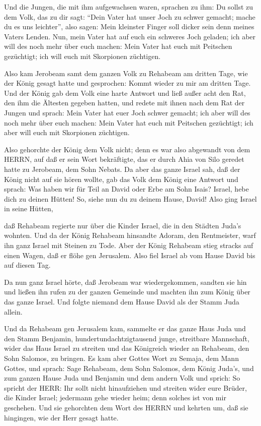  Und die Jungen, die mit ihm aufgewachsen waren, sprachen
zu ihm: Du sollst zu dem Volk, das zu dir sagt: ``Dein Vater hat unser
Joch zu schwer gemacht; mache du es uns leichter'', also sagen: Mein
kleinster Finger soll dicker sein denn meines Vaters Lenden.
 Nun, mein Vater hat auf euch ein schweres Joch geladen;
ich aber will des noch mehr über euch machen: Mein Vater hat euch mit
Peitschen gezüchtigt; ich will euch mit Skorpionen züchtigen.

 Also kam Jerobeam samt dem ganzen Volk zu Rehabeam am
dritten Tage, wie der König gesagt hatte und gesprochen: Kommt wieder zu
mir am dritten Tage.  Und der König gab dem Volk eine harte
Antwort und ließ außer acht den Rat, den ihm die Ältesten gegeben
hatten,  und redete mit ihnen nach dem Rat der Jungen und
sprach: Mein Vater hat euer Joch schwer gemacht; ich aber will des noch
mehr über euch machen: Mein Vater hat euch mit Peitschen gezüchtigt; ich
aber will euch mit Skorpionen züchtigen.

 Also gehorchte der König dem Volk nicht; denn es war also
abgewandt von dem HERRN, auf daß er sein Wort bekräftigte, das er durch
Ahia von Silo geredet hatte zu Jerobeam, dem Sohn Nebats. 
Da aber das ganze Israel sah, daß der König nicht auf sie hören wollte,
gab das Volk dem König eine Antwort und sprach: Was haben wir für Teil
an David oder Erbe am Sohn Isais? Israel, hebe dich zu deinen Hütten!
So, siehe nun du zu deinem Hause, David! Also ging Israel in seine
Hütten,

 daß Rehabeam regierte nur über die Kinder Israel, die in
den Städten Juda's wohnten.  Und da der König Rehabeam
hinsandte Adoram, den Rentmeister, warf ihn ganz Israel mit Steinen zu
Tode. Aber der König Rehabeam stieg stracks auf einen Wagen, daß er
flöhe gen Jerusalem.  Also fiel Israel ab vom Hause David
bis auf diesen Tag.

 Da nun ganz Israel hörte, daß Jerobeam war wiedergekommen,
sandten sie hin und ließen ihn rufen zu der ganzen Gemeinde und machten
ihn zum König über das ganze Israel. Und folgte niemand dem Hause David
als der Stamm Juda allein.

 Und da Rehabeam gen Jerusalem kam, sammelte er das ganze
Haus Juda und den Stamm Benjamin, hundertundachtzigtausend junge,
streitbare Mannschaft, wider das Haus Israel zu streiten und das
Königreich wieder an Rehabeam, den Sohn Salomos, zu bringen.
 Es kam aber Gottes Wort zu Semaja, dem Mann Gottes, und
sprach:  Sage Rehabeam, dem Sohn Salomos, dem König Juda's,
und zum ganzen Hause Juda und Benjamin und dem andern Volk und sprich:
 So spricht der HERR: Ihr sollt nicht hinaufziehen und
streiten wider eure Brüder, die Kinder Israel; jedermann gehe wieder
heim; denn solches ist von mir geschehen. Und sie gehorchten dem Wort
des HERRN und kehrten um, daß sie hingingen, wie der Herr gesagt hatte.

